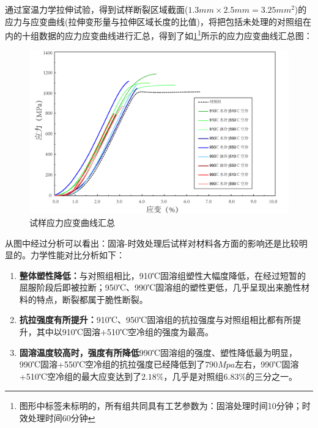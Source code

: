 通过室温力学拉伸试验，得到试样断裂区域截面($ 1.3mm\times2.5mm=3.25mm^2 $)的应力与应变曲线(拉伸变形量与拉伸区域长度的比值)，将把包括未处理的对照组在内的十组数据的应力应变曲线进行汇总，得到了如\ref{fig:试样应力应变曲线汇总}\footnote{图形中标签未标明的，所有组共同具有工艺参数为：固溶处理时间10分钟；时效处理时间60分钟}所示的应力应变曲线汇总图：
\begin{figure}[h!]
	\centering
	\includegraphics[width=0.99\linewidth]{pic/试样应力应变曲线汇总min.png}
	\caption{试样应力应变曲线汇总}
	\label{fig:试样应力应变曲线汇总}
\end{figure}
从图中经过分析可以看出：固溶-时效处理后试样对材料各方面的影响还是比较明显的。力学性能对比分析如下：
\begin{enumerate}
	\item \textbf{整体塑性降低：}与对照组相比，910℃固溶组塑性大幅度降低，在经过短暂的屈服阶段后即被拉断；950℃、990℃固溶组的塑性更低，几乎呈现出来脆性材料的特点，断裂都属于脆性断裂。
	\item \textbf{抗拉强度有所提升：}910℃、950℃固溶组的抗拉强度与对照组相比都有所提升，其中以910℃固溶+510℃空冷组的强度为最高。
	\item \textbf{固溶温度较高时，强度有所降低}990℃固溶组的强度、塑性降低最为明显，990℃固溶+550℃空冷组的抗拉强度已经降低到了$ 790Mpa $左右，990℃固溶+510℃空冷组的最大应变达到了$ 2.18\% $，几乎是对照组$ 6.83\% $的三分之一。
\end{enumerate}
